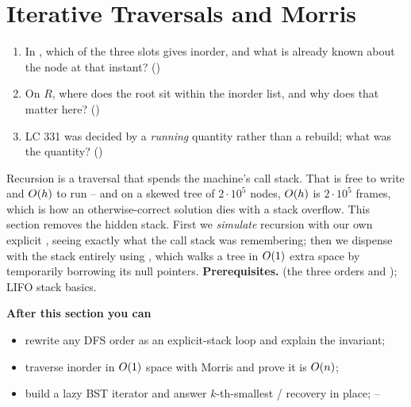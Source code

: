 \section{Iterative Traversals and Morris}\label{sec:c03-iterative}

\begin{previouslybox}
\begin{enumerate}[nosep, leftmargin=1.6em]
  \item In , which of the three slots gives inorder, and what is
        already known about the node at that instant? ()
  \item On $R$, where does the root sit within the inorder list, and why does that
        matter here? ()
  \item LC 331 was decided by a \emph{running} quantity rather than a rebuild; what
        was the quantity? ()
\end{enumerate}
\end{previouslybox}

\begin{topicintro}
Recursion is a traversal that spends the machine's call stack. That is free to write
and $O(h)$ to run -- and on a skewed tree of $2\cdot10^{5}$ nodes, $O(h)$ is
$2\cdot10^{5}$ frames, which is how an otherwise-correct solution dies with a stack
overflow. This section removes the hidden stack. First we \emph{simulate} recursion with
our own explicit , seeing exactly what the call stack was remembering; then
we dispense with the stack entirely using , which walks a tree in
$O(1)$ extra space by temporarily borrowing its null pointers.
\textbf{Prerequisites.}  (the three orders and );
LIFO stack basics.

\textbf{After this section you can}
\begin{itemize}[nosep]
  \item rewrite any DFS order as an explicit-stack loop and explain the invariant;   \hfill{}
  \item traverse inorder in $O(1)$ space with Morris and prove it is $O(n)$; \hfill{}
  \item build a lazy BST iterator and answer $k$-th-smallest / recovery in place;    \hfill{}--
\end{itemize}
\end{topicintro}

